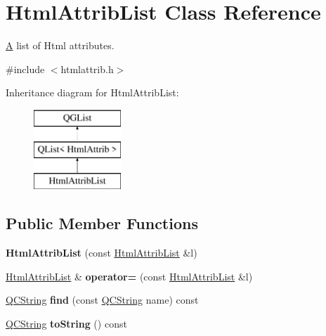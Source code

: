 \hypertarget{class_html_attrib_list}{}\section{Html\+Attrib\+List Class Reference}
\label{class_html_attrib_list}


\mbox{\hyperlink{class_a}{A}} list of Html attributes.  




{\ttfamily \#include $<$htmlattrib.\+h$>$}

Inheritance diagram for Html\+Attrib\+List\+:\begin{figure}[H]
\begin{center}
\leavevmode
\includegraphics[height=3.000000cm]{class_html_attrib_list}
\end{center}
\end{figure}
\subsection*{Public Member Functions}
\begin{DoxyCompactItemize}
\item 
\mbox{\label{class_html_attrib_list_a00e723777ae8d075de72272720914f5f}} 
{\bfseries Html\+Attrib\+List} (const \mbox{\hyperlink{class_html_attrib_list}{Html\+Attrib\+List}} \&l)
\item 
\mbox{\label{class_html_attrib_list_a7120c5321790b23f71c77ca2a71110a1}} 
\mbox{\hyperlink{class_html_attrib_list}{Html\+Attrib\+List}} \& {\bfseries operator=} (const \mbox{\hyperlink{class_html_attrib_list}{Html\+Attrib\+List}} \&l)
\item 
\mbox{\label{class_html_attrib_list_aeed35d57c1500dcc8c6ba6c379c5629c}} 
\mbox{\hyperlink{class_q_c_string}{Q\+C\+String}} {\bfseries find} (const \mbox{\hyperlink{class_q_c_string}{Q\+C\+String}} name) const
\item 
\mbox{\label{class_html_attrib_list_a3df116a559130d0e0cf9aa26633bf852}} 
\mbox{\hyperlink{class_q_c_string}{Q\+C\+String}} {\bfseries to\+String} () const
\end{DoxyCompactItemize}


